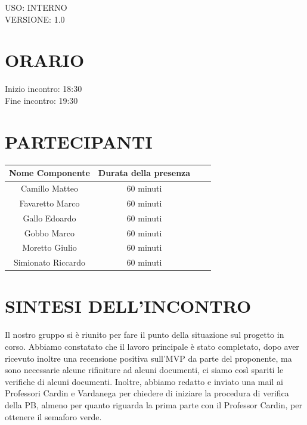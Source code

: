 \documentclass[5pt]{article}
\begin{document}
\begin{flushright}
    \begin{spacing}{1}
        USO: INTERNO\\
        VERSIONE: 1.0\\
    \end{spacing}
\end{flushright}


\restoregeometry

\pagebreak


\section{ORARIO}
\begin{spacing}{1.5}
    {\large Inizio incontro: 18:30}\\
    {\large Fine incontro: 19:30} 
\end{spacing}

\section{PARTECIPANTI}
\setlength\cellspacetoplimit{6pt}
\setlength\cellspacebottomlimit{6pt}

\begin{table}[ht]
  \begin{tabular}{|Sc|Sc|}
    \hline
    \textbf{Nome Componente} & \textbf{Durata della presenza} \\
    \hline
    Camillo Matteo & 60 minuti \\
    Favaretto Marco & 60 minuti \\
    Gallo Edoardo & 60 minuti \\
    Gobbo Marco & 60 minuti \\
    Moretto Giulio & 60 minuti \\
    Simionato Riccardo & 60 minuti \\
    \hline
  \end{tabular}
  \label{tab:conference}
\end{table}

\section{SINTESI DELL'INCONTRO}
Il nostro gruppo si è riunito per fare il punto della situazione sul progetto in corso. Abbiamo constatato che il lavoro principale è stato completato, dopo aver ricevuto inoltre una recensione positiva sull'MVP da parte del proponente, ma sono necessarie alcune rifiniture ad alcuni documenti, ci siamo così spariti le verifiche di alcuni documenti. Inoltre, abbiamo redatto e inviato una mail ai Professori Cardin e Vardanega per chiedere di iniziare la procedura di verifica della PB, almeno per quanto riguarda la prima parte con il Professor Cardin, per ottenere il semaforo verde.
\end{document}
